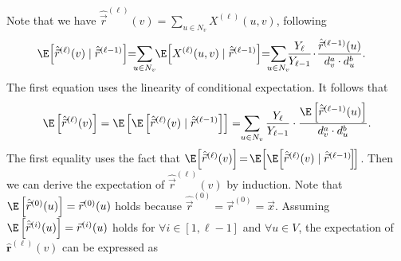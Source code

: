 Note that we have $\hat{\vec{r}}^{(\ell)}(v)=\sum_{u \in N_v} X^{(\ell)}(u,v)$, following
\begin{equation}\label{eqn:con-exp}
\begin{aligned}
&\E \hspace{-0.5mm} \left[ \hat{\vec{r}}^{(\ell)}(v)\mid \hat{\vec{r}}^{(\ell-1)} \right]%
\hspace{-1mm}=\hspace{-2mm}\sum_{u \in N_v} \hspace{-1mm}\E \hspace{-0.5mm}\left[ X^{(\ell)}(u,v) \mid \hat{\vec{r}}^{(\ell-1)} \right]\hspace{-1mm} =\hspace{-2mm}\sum_{u \in N_v} \hspace{-1.5mm}\frac{Y_{\ell}}{Y_{\ell-1}}\hspace{-0.5mm}\cdot \hspace{-0.5mm} \frac{\hat{\vec{r}}^{(\ell-1)}(u)}{d_v^a\cdot d_u^b}. 
\end{aligned}
\end{equation}
The first equation uses the linearity of conditional expectation. It follows that
\begin{equation}\nonumber%
\begin{aligned}
\E \left[ \hat{\vec{r}}^{(\ell)}(v) \right]=\E \left[\E \left[ \hat{\vec{r}}^{(\ell)}(v)\mid \hat{\vec{r}}^{(\ell-1)} \right]\right]=\hspace{-1mm} \sum_{u \in N_v} \frac{Y_{\ell}}{Y_{\ell-1}} \cdot \frac{\E \left[\hat{\vec{r}}^{(\ell-1)}(u)\right]}{d_v^a\cdot d_u^b}. 
\end{aligned}
\end{equation} 
The first equality uses the fact that $\E \hspace{-0.5mm}\left[\hat{\vec{r}}^{(\ell)}(v) \right]\hspace{-0.5mm}=\hspace{-0.5mm}\E \hspace{-0.5mm}\left[\E \hspace{-0.5mm}\left[ \hat{\vec{r}}^{(\ell)}(v)\mid \hat{\vec{r}}^{(\ell-1)}\hspace{-0.5mm} \right]\hspace{-0.5mm}\right]$. 
Then we can derive the expectation of $\hat{\vec{r}}^{(\ell)}(v)$ by induction. Note that $\E \left[ \hat{\vec{r}}^{(0)}(u) \right]=\vec{r}^{(0)}(u)$ holds because $\hat{\vec{r}}^{(0)}=\vec{r}^{(0)}=\vec{x}$. Assuming $\E \left[ \hat{\vec{r}}^{(i)}(u) \right]=\vec{r}^{(i)}(u)$ holds for $\forall i \in [1,\ell-1]$ and $\forall u \in V$, the expectation of $\hat{\bm{r}}^{(\ell)}(v)$ can be expressed as %

